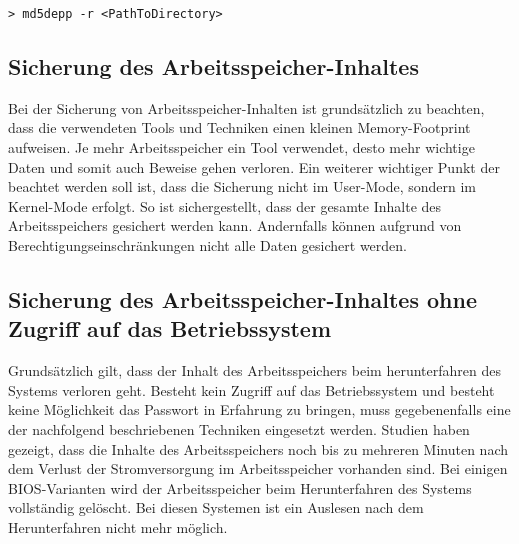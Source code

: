 \begin{lstlisting}
> md5depp -r <PathToDirectory>
\end{lstlisting}



\subsection{Sicherung des Arbeitsspeicher-Inhaltes}
Bei der Sicherung von Arbeitsspeicher-Inhalten ist grundsätzlich zu beachten, dass die verwendeten Tools und Techniken einen kleinen Memory-Footprint aufweisen. Je mehr Arbeitsspeicher ein Tool verwendet, desto mehr wichtige Daten und somit auch Beweise gehen verloren. Ein weiterer wichtiger Punkt der beachtet werden soll ist, dass die Sicherung nicht im User-Mode, sondern im Kernel-Mode erfolgt. So ist sichergestellt, dass der gesamte Inhalte des Arbeitsspeichers gesichert werden kann. Andernfalls können aufgrund von Berechtigungseinschränkungen nicht alle Daten gesichert werden.

\subsection{Sicherung des Arbeitsspeicher-Inhaltes ohne Zugriff auf das Betriebssystem}
Grundsätzlich gilt, dass der Inhalt des Arbeitsspeichers beim herunterfahren des Systems verloren geht. Besteht kein Zugriff auf das Betriebssystem und besteht keine Möglichkeit das Passwort in Erfahrung zu bringen, muss gegebenenfalls eine der nachfolgend beschriebenen Techniken eingesetzt werden. Studien haben gezeigt, dass die Inhalte des Arbeitsspeichers noch bis zu mehreren Minuten nach dem Verlust der Stromversorgung im Arbeitsspeicher vorhanden sind. Bei einigen BIOS-Varianten wird der Arbeitsspeicher beim Herunterfahren des Systems vollständig gelöscht. Bei diesen Systemen ist ein Auslesen nach dem Herunterfahren nicht mehr möglich.

